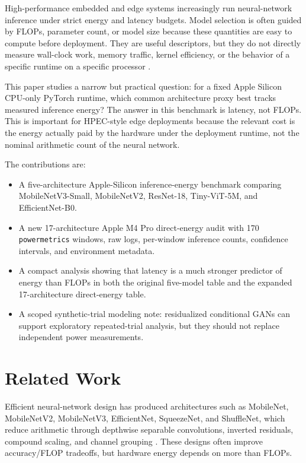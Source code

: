 \documentclass[conference]{IEEEtran}
\begin{document}
High-performance embedded and edge systems increasingly run neural-network
inference under strict energy and latency budgets. Model selection is often
guided by FLOPs, parameter count, or model size because these quantities are
easy to compute before deployment. They are useful descriptors, but they do
not directly measure wall-clock work, memory traffic, kernel efficiency, or
the behavior of a specific runtime on a specific processor \cite{horowitz2014,
eyeriss2016, mobilenetv3}.

This paper studies a narrow but practical question: for a fixed Apple Silicon
CPU-only PyTorch runtime, which common architecture proxy best tracks measured
inference energy? The answer in this benchmark is latency, not FLOPs. This is
important for HPEC-style edge deployments because the relevant cost is the
energy actually paid by the hardware under the deployment runtime, not the
nominal arithmetic count of the neural network.

The contributions are:
\begin{itemize}
    \item A five-architecture Apple-Silicon inference-energy benchmark
    comparing MobileNetV3-Small, MobileNetV2, ResNet-18, Tiny-ViT-5M, and
    EfficientNet-B0.
    \item A new 17-architecture Apple M4 Pro direct-energy audit with 170
    \texttt{powermetrics} windows, raw logs, per-window inference counts,
    confidence intervals, and environment metadata.
    \item A compact analysis showing that latency is a much stronger predictor
    of energy than FLOPs in both the original five-model table and the
    expanded 17-architecture direct-energy table.
    \item A scoped synthetic-trial modeling note: residualized conditional
    GANs can support exploratory repeated-trial analysis, but they should not
    replace independent power measurements.
\end{itemize}

\section{Related Work}

Efficient neural-network design has produced architectures such as MobileNet,
MobileNetV2, MobileNetV3, EfficientNet, SqueezeNet, and ShuffleNet, which
reduce arithmetic through depthwise separable convolutions, inverted
residuals, compound scaling, and channel grouping \cite{mobilenet,
mobilenetv2, mobilenetv3, efficientnet, squeezenet, shufflenet}. These
designs often improve accuracy/FLOP tradeoffs, but hardware energy depends on
more than FLOPs.
\end{document}
